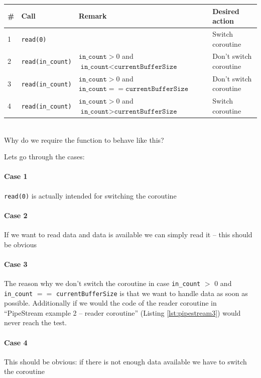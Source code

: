 \documentclass[10pt]{scrbook}
\begin{document}
\begin{tabular}{| l | l | p{4.9cm} | l |}
\hline
\# & Call & Remark & Desired action \\
\hline
\hline
  1 & \texttt{read(0)} & & Switch coroutine \\
\hline
\hline
  2 & \texttt{read(in\_count)} & $\texttt{in\_count} > 0$ and $\texttt{in\_count} < \texttt{currentBufferSize}$ & Don't switch coroutine \\
\hline
  3 & \texttt{read(in\_count)} & $\texttt{in\_count} > 0$ and $\texttt{in\_count} == \texttt{currentBufferSize}$ & Don't switch coroutine \\
\hline
  4 & \texttt{read(in\_count)} & $\texttt{in\_count} > 0$ and $\texttt{in\_count} > \texttt{currentBufferSize}$ & Switch coroutine \\
\hline
\end{tabular}
\\

Why do we require the function to behave like this?

Lets go through the cases:

\paragraph{Case 1} \texttt{read(0)} is actually intended for switching the coroutine

\paragraph{Case 2} If we want to read data and data is available we can simply read it -- this should be obvious

\paragraph{Case 3} The reason why we don't switch the coroutine in case \texttt{in\_count} $>$ 0 and \texttt{in\_count} $==$ \texttt{currentBufferSize} is that we want to handle data as soon as possible. Additionally if we would the code of the reader coroutine in ``PipeStream example 2 -- reader coroutine'' (Listing \ref{lst:pipestream3}) would never reach the test.

\paragraph{Case 4} This should be obvious: if there is not enough data available we have to switch the coroutine
\end{document}
